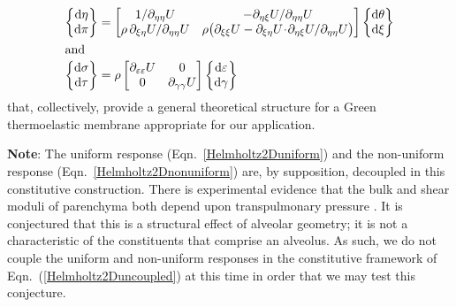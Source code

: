 \begin{subequations}
\label{Helmholtz2Duncoupled}
\begin{align}
\left\{ \begin{matrix}
\mathrm{d} \eta \\ \mathrm{d} \pi 
\end{matrix} \right\} & = \begin{bmatrix}
1 / \partial_{\eta\eta} U & 
-\partial_{\eta\xi} U / \partial_{\eta\eta} U \\ 
\rho \, \partial_{\xi\eta} U / \partial_{\eta\eta} U & 
\rho \bigl( \partial_{\xi\xi} U - \partial_{\xi\eta} U \!\cdot\! \partial_{\eta\xi} U / \partial_{\eta\eta} U \bigr)  
\end{bmatrix} 
\left\{ \begin{matrix}
\mathrm{d}\theta \\ \mathrm{d} \xi 
\end{matrix} \right\}
\label{Helmholtz2Duniform} \\
\intertext{and}
\left\{ \begin{matrix}
    \mathrm{d} \sigma \\ \mathrm{d} \tau
\end{matrix} \right\} & = \rho \begin{bmatrix}
    \partial_{\varepsilon\varepsilon} U & 0 \\
    0 & \partial_{\gamma\gamma} U 
\end{bmatrix} 
\left\{ \begin{matrix}
    \mathrm{d} \varepsilon \\ \mathrm{d} \gamma
\end{matrix} \right\}
\label{Helmholtz2Dnonuniform}
\end{align} 
\end{subequations}
that, collectively, provide a general theoretical structure for a Green thermo\-elastic membrane appropriate for our application.

\medskip\noindent
\textbf{Note}:  The uniform response (Eqn.~\ref{Helmholtz2Duniform}) and the non-uniform response (Eqn.~\ref{Helmholtz2Dnonuniform}) are, by supposition, decoupled in this constitutive construction.  There is experimental evidence that the bulk and shear moduli of parenchyma both depend upon transpulmonary pressure \cite{LaiFook79,Jahedetal90}.  It is conjectured that this is a structural effect of alveolar geometry; it is not a characteristic of the constituents that comprise an alveolus.  As such, we do not couple the uniform and non-uniform responses in the constitutive framework of Eqn.~(\ref{Helmholtz2Duncoupled}) at this time in order that we may test this conjecture.

